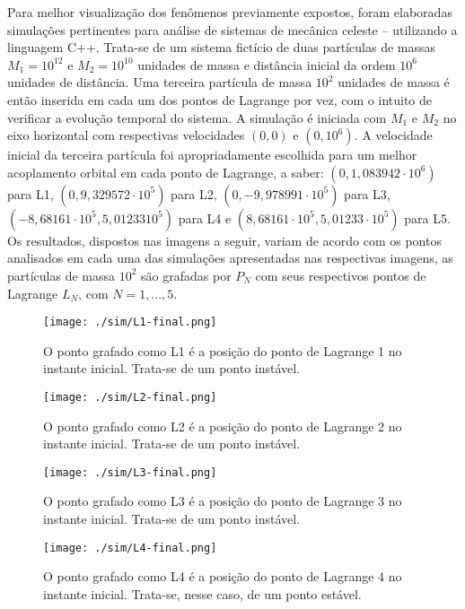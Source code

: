    Para melhor visualização dos fenômenos previamente expostos, foram elaboradas simulações pertinentes para análise de sistemas de mecânica celeste \cite{sashalag, sashaeng} -- utilizando a linguagem C++. Trata-se de um sistema fictício de duas partículas de massas $M_1 = 10^{12}$ e $M_2 = 10^{10}$ unidades de massa e distância inicial da ordem $10^6$ unidades de distância. Uma terceira partícula de massa $10^2$ unidades de massa é então inserida em cada um dos pontos de Lagrange por vez, com o intuito de verificar a evolução temporal do sistema. A simulação é iniciada com $M_1$ e $M_2$ no eixo horizontal com respectivas velocidades $(0,0)$ e $(0, 10^6)$. A velocidade inicial da terceira partícula foi apropriadamente escolhida para um melhor acoplamento orbital em cada ponto de Lagrange, a saber: $(0,1,083942 \cdot 10^6)$ para L1, $(0,9,329572 \cdot 10^5)$ para L2, $(0,-9,978991 \cdot 10^5)$ para L3, $(-8,68161\cdot 10^5, 5,01233 10^5)$ para L4 e $(8,68161\cdot 10^5, 5,01233 \cdot 10^5)$ para L5. Os resultados, dispostos nas imagens a seguir, variam de acordo com os pontos analisados em cada uma das simulações apresentadas nas respectivas imagens, as partículas de massa $10^2$ são grafadas por $P_{N}$ com seus respectivos pontos de Lagrange $L_{N}$, com $N = 1,..., 5$. 
   
\begin{figure}[H]
\centering
\texttt{[image: ./sim/L1-final.png]}
\caption{O ponto grafado como L1 é a posição do ponto de Lagrange 1 no instante inicial. Trata-se de um ponto instável.}
\end{figure}

\begin{figure}[H]
\centering
\texttt{[image: ./sim/L2-final.png]}
\caption{O ponto grafado como L2 é a posição do ponto de Lagrange 2 no instante inicial. Trata-se de um ponto instável.}
\end{figure}

\begin{figure}[H]
\centering
\texttt{[image: ./sim/L3-final.png]}
\caption{O ponto grafado como L3 é a posição do ponto de Lagrange 3 no instante inicial. Trata-se de um ponto instável.}
\end{figure}

\begin{figure}[H]
\centering
\texttt{[image: ./sim/L4-final.png]}
\caption{O ponto grafado como L4 é a posição do ponto de Lagrange 4 no instante inicial. Trata-se, nesse caso, de um ponto estável.}
\end{figure}

